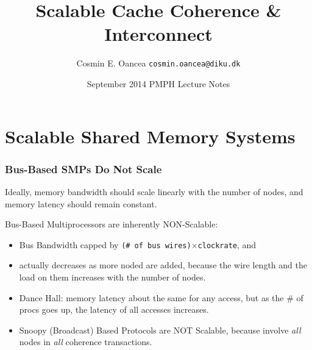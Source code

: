 \documentclass{beamer}
\title[Interconnect]{Scalable Cache Coherence \& Interconnect}
\author[C.~Oancea]{Cosmin E. Oancea {\tt cosmin.oancea@diku.dk}}
\institute{Department of Computer Science (DIKU)\\University of Copenhagen}
\date[Sept 2014]{September 2014 PMPH Lecture Notes}
\renewcommand{\emph}[1]{\textcolor{structure}{#1}}
\newcommand{\emp}[1]{\textcolor{DikuRed}{ #1}}
\begin{document}
\titleslide




\begin{frame}[fragile]
	\tableofcontents
\end{frame}


\section{Scalable Shared Memory Systems}

\begin{frame}[fragile,t]
\frametitle{Bus-Based SMPs Do Not Scale}

\emph{Ideally, memory bandwidth should scale linearly with the number of nodes,
and memory latency should remain constant}.\bigskip

\alert{Bus-Based Multiprocessors are inherently NON-Scalable}:\medskip
\begin{itemize}
    \item \emp{Bus Bandwidth} capped by {\tt (\# of bus wires)$\times$clockrate}, and
    \item \emp{actually decreases as more noded are added}, 
            because the wire length and the load on them 
            increases with the number of nodes.\bigskip
    \item Dance Hall: memory latency about the same for any access,
            but as the \# of procs goes up, the latency of all
            accesses increases.\bigskip
    \item \emp{Snoopy (Broadcast) Based Protocols are NOT Scalable},
            because involve {\em all} nodes in {\em all} coherence transactions. 
\end  {itemize}
\end{frame}
\end{document}
